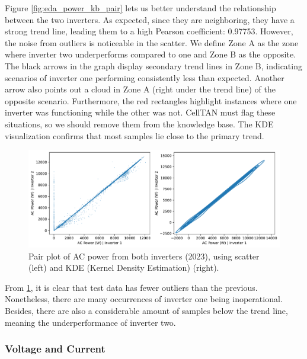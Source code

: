 Figure \ref{fig:eda_power_kb_pair} lets us better understand the relationship between the two inverters. As expected, since they are neighboring, they have a strong trend line, leading them to a high Pearson coefficient: 0.97753. However, the noise from outliers is noticeable in the scatter. We define Zone A as the zone where inverter two underperforms compared to one and Zone B as the opposite. The black arrows in the graph display secondary trend lines in Zone B, indicating scenarios of inverter one performing consistently less than expected. Another arrow also points out a cloud in Zone A (right under the trend line) of the opposite scenario. Furthermore, the red rectangles highlight instances where one inverter was functioning while the other was not. CellTAN must flag these situations, so we should remove them from the knowledge base.
The KDE visualization confirms that most samples lie close to the primary trend.

\begin{figure}[h!]
    \centering
    \includegraphics[width=\textwidth]{figures/chapter5/analysis/03_power_pairplots_test.pdf}
    \caption{Pair plot of AC power from both inverters (2023), using scatter (left) and KDE (Kernel Density Estimation) (right).}
    \label{fig:eda_power_test_pair}
\end{figure}

From \ref{fig:eda_power_test_pair}, it is clear that test data has fewer outliers than the previous. Nonetheless, there are many occurrences of inverter one being inoperational. Besides, there are also a considerable amount of samples below the trend line, meaning the underperformance of inverter two.


\subsubsection{Voltage and Current} \label{subsubsec:eda_volt_curr}

